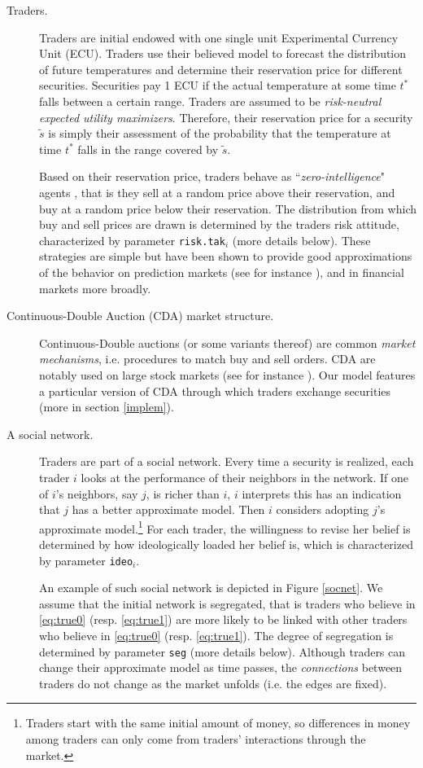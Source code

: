 \documentclass[10pt,a4paper]{article}
\begin{document}
\begin{description}
 		\item[ Traders.] Traders are initial endowed with one single unit Experimental Currency Unit (ECU).  
 		Traders use their believed model to forecast the distribution of future temperatures and determine their reservation price for different securities. Securities pay 1 ECU  if the actual temperature at some time $t^*$ falls between a certain range. Traders are assumed to be \emph{risk-neutral expected utility maximizers}. Therefore, their reservation price for a security $\tilde{s}$ is simply their assessment of the probability that the temperature at time $t^*$ falls in the range covered by $\tilde{s}$.
 		
 		 Based on their reservation price, traders behave as ``\emph{zero-intelligence}" agents \citep{Gode1993}, that is they sell at a random price above their reservation, and buy at a random price below their reservation. The distribution from which buy and sell prices are drawn is determined by the traders risk attitude, characterized by parameter \texttt{risk.tak}$_i$ (more details below). These strategies are simple but have been shown to provide good approximations of the behavior on prediction markets (see for instance \cite{Klingert2012c}), and in financial markets more broadly. 
 		 
 		 
 		  
 		\item[Continuous-Double Auction (CDA) market structure.] Continuous-Double auctions (or some variants thereof) are common \emph{market mechanisms}, i.e. procedures to match buy and sell orders. CDA are notably used on large stock markets (see for instance \cite{Tseng2010a}). Our model features a particular version of CDA through which traders exchange securities (more in section \ref{implem}). 
 		
 		\item[A social network.] Traders are part of a social network. Every time a security is realized, each trader $i$ looks at the performance of their neighbors in the network. If one of $i$'s neighbors, say $j$, is richer than $i$, $i$ interprets this has an indication that $j$ has a better approximate model. Then $i$ considers adopting $j$'s approximate model.\footnote{Traders start with the same initial amount of money, so differences in money among traders can only come from  traders' interactions through the market.} For each trader, the willingness to revise her belief is determined by how ideologically loaded her belief is, which is characterized by parameter \texttt{ideo}$_i$.
 		
 		An example of such social network is depicted in Figure \ref{socnet}.
 		We assume that the initial network is segregated, that is traders who believe in \eqref{eq:true0} (resp. \eqref{eq:true1}) are more likely to be linked with other traders who believe in \eqref{eq:true0}  (resp. \eqref{eq:true1}). The degree of segregation is determined by parameter \texttt{seg} (more details below). Although traders can change their approximate model as time passes, the \emph{connections} between traders do not change as the market unfolds (i.e. the edges are fixed).
 	\end{description}
 	
\end{document}
